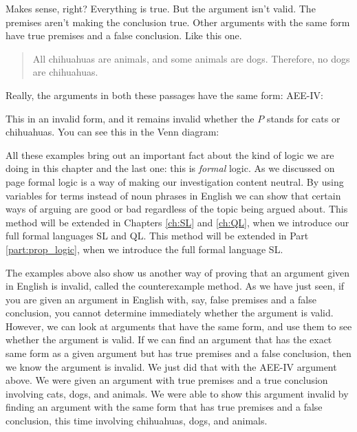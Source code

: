 Makes sense, right? Everything is true. But the argument isn't valid. The premises aren't making the conclusion true. Other arguments with the same form have true premises and a false conclusion. Like this one.

\begin{quotation}All chihuahuas are animals, and some animals are dogs. Therefore, no dogs are chihuahuas.\end{quotation}

Really, the arguments in both these passages have the same form: AEE-IV:

\begin{kormanize}
\end{kormanize}

This in an invalid form, and it remains invalid whether the $P$ stands for cats or chihuahuas. You can see this in the Venn diagram:



All these examples bring out an important fact about the kind of logic we are doing in this chapter and the last one: this is \emph{formal} logic. As we discussed on page \pageref{def:formal_logic} formal logic is a way of making our investigation content neutral. By using variables for terms instead of noun phrases in English we can show that certain ways of arguing are good or bad regardless of the topic being argued about. This method will be extended in Chapters \ref{ch:SL} and \ref{ch:QL}, when we introduce our full formal languages SL and QL.
This method will be extended in Part \ref{part:prop_logic}, when we introduce the full formal language SL.


The examples above also show us another way of proving that an argument given in English is invalid, called the counterexample method. As we have just seen, if you are given an argument in English with, say, false premises and a false conclusion, you cannot determine immediately whether the argument is valid. However, we can look at arguments that have the same form, and use them to see whether the argument is valid. If we can find an argument that has the exact same form as a given argument but has true premises and a false conclusion, then we know the argument is invalid. We just did that with the AEE-IV argument above. We were given an argument with true premises and a true conclusion involving cats, dogs, and animals. We were able to show this argument invalid by finding an argument with the same form that has true premises and a false conclusion, this time involving chihuahuas, dogs, and animals.


